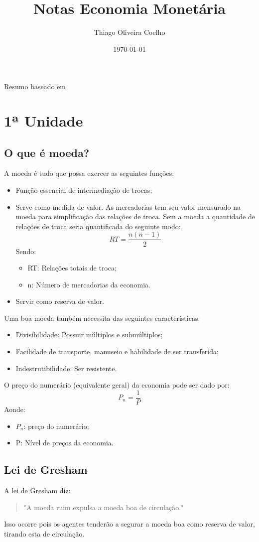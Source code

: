 \documentclass[12pt,a4paper,oneside,brazil]{abntex2}
\title{Notas Economia Monetária}
\author{Thiago Oliveira Coelho}
\date{\today}
\begin{document}
\pagestyle{plain}
\maketitle
\begin{center}
Resumo baseado em \cite{rossetti98}
\end{center}
\tableofcontents
\chapter{1ª Unidade}

\section{O que é moeda?}
A moeda é tudo que possa exercer as seguintes funções:
\begin{itemize}
\item Função essencial de intermediação de trocas;
\item Serve como medida de valor. As mercadorias tem seu valor mensurado na moeda para simplificação das relações de troca. Sem a moeda a quantidade de relações de troca seria quantificada do seguinte modo: 
\[ RT = \frac{n (n-1)}{2}\]
Sendo:
\begin{itemize}
\item RT: Relações totais de troca;
\item n: Número de mercadorias da economia.
\end{itemize}
\item Servir como reserva de valor.
\end{itemize}
Uma boa moeda também necessita das seguintes características:
\begin{itemize}
	\item Divisibilidade: Possuir múltiplos e submúltiplos;
\item Facilidade de transporte, manuseio e habilidade de ser transferida;
\item Indestrutibilidade: Ser resistente.
\end{itemize}

O preço do numerário (equivalente geral) da economia pode ser dado por:
\[P_n = \frac{1}{P}\] 
Aonde:
\begin{itemize}
\item $P_n$: preço do numerário;
\item P: Nível de preços da economia.
\end{itemize}

\section{Lei de Gresham}
A lei de Gresham diz: 
\begin{quote}
"A moeda ruim expulsa a moeda boa de circulação."
\end{quote}
Isso ocorre pois os agentes tenderão a segurar a moeda boa como reserva de valor, tirando esta de circulação.
\end{document}
